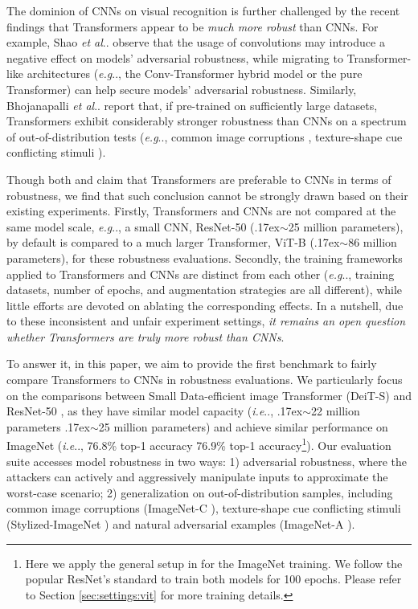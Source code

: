 \documentclass{article}
\makeatletter
\def\vs{{\bm{s}}}
\newcommand{\app}{\raise.17ex\hbox{$\scriptstyle\sim$}}
\DeclareRobustCommand\onedot{\futurelet\@let@token\@onedot}
\def\@onedot{\ifx\@let@token.\else.\null\fi\xspace}
\def\eg{\emph{e.g}\onedot} \def\Eg{\emph{E.g}\onedot}
\def\ie{\emph{i.e}\onedot} \def\Ie{\emph{I.e}\onedot}
\def\etal{\emph{et al}\onedot}
\makeatother
\begin{document}
The dominion of CNNs on visual recognition is further challenged by the recent findings that Transformers appear to be \emph{much more robust} than CNNs. For example, Shao \etal \cite{shao2021adversarial} observe that the usage of convolutions may introduce a negative effect on models' adversarial robustness, while migrating to Transformer-like architectures (\eg, the Conv-Transformer hybrid model or the pure Transformer) can help secure models' adversarial robustness. Similarly, Bhojanapalli \etal \cite{bhojanapalli2021understanding} report that, if pre-trained on sufficiently large datasets, Transformers exhibit considerably stronger robustness than CNNs on a spectrum of out-of-distribution tests (\eg, common image corruptions \cite{Hendrycks2018}, texture-shape cue conflicting stimuli \cite{Geirhos2018}).  

Though both \cite{bhojanapalli2021understanding} and \cite{shao2021adversarial} claim that Transformers are preferable to CNNs in terms of robustness, we find that such conclusion cannot be strongly drawn based on their existing experiments. Firstly, Transformers and CNNs are not compared at the same model scale, \eg, a small CNN, ResNet-50 (\app25 million parameters), by default is compared to a much larger Transformer, ViT-B (\app86 million parameters), for these robustness evaluations. Secondly, the training frameworks applied to Transformers and CNNs are distinct from each other (\eg, training datasets, number of epochs, and augmentation strategies are all different), while little efforts are devoted on ablating the corresponding effects. In a nutshell, due to these inconsistent and unfair experiment settings, \emph{it remains an open question whether Transformers are truly more robust than CNNs}.

To answer it, in this paper, we aim to provide the first benchmark to fairly compare Transformers to CNNs in robustness evaluations. We particularly focus on the comparisons between Small Data-efficient image Transformer (DeiT-S) \cite{touvron2020training} and ResNet-50 \cite{He2016}, as they have similar model capacity (\ie, \app22 million parameters \vs \app25 million parameters) and achieve similar performance on ImageNet (\ie, 76.8\% top-1 accuracy \vs 76.9\% top-1 accuracy\footnote{Here we apply the general setup in \cite{pmlr-v139-touvron21a} for the ImageNet training. We follow the popular ResNet's standard to train both models for 100 epochs. Please refer to Section \ref{sec:settings:vit} for more  training details.}). Our evaluation suite accesses model robustness in two ways: 1) adversarial robustness, where the attackers can actively and aggressively manipulate inputs to approximate the worst-case scenario; 2) generalization on out-of-distribution samples, including common image corruptions (ImageNet-C \cite{Hendrycks2018}), texture-shape cue conflicting stimuli (Stylized-ImageNet \cite{Geirhos2018}) and natural adversarial examples (ImageNet-A \cite{hendrycks2021nae}).
\end{document}
